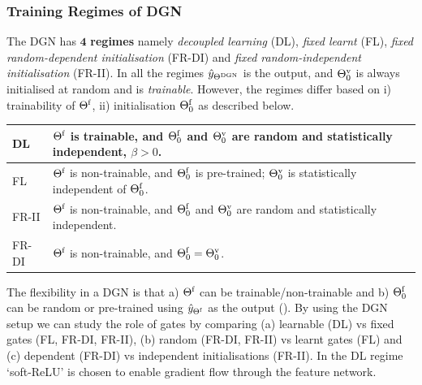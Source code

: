 \subsubsection{Training Regimes of DGN}
\begin{definition}\label{rm:regime}The DGN has $\mathbf{4}$ \textbf{regimes} namely \emph{decoupled learning} (DL), \emph{fixed learnt} (FL), \emph{fixed random-dependent initialisation} (FR-DI) and \emph{fixed random-independent initialisation} (FR-II). 
In all the regimes $\hat{y}_{\Theta^{\text{DGN}}}$ is the output, and ${\Theta}^{\text{v}}_0$ is always initialised at random and is \emph{trainable}. However, the regimes differ based on i) trainability of $\Theta^{\textrm{f}}$, ii) initialisation $\Theta^{\textrm{f}}_0$ as described below.\\
\begin{tabular}{|l|p{6cm}|}\hline
DL               & $\Theta^{\textrm{f}}$ is trainable, and $\Theta^{\textrm{f}}_0$ and ${\Theta}^{\text{v}}_0$ are random and statistically independent,  $\beta>0$.\\\hline
FL               & $\Theta^{\textrm{f}}$ is non-trainable, and $\Theta^{\textrm{f}}_0$ is pre-trained;  ${\Theta}^{\text{v}}_0$ is statistically independent of $\Theta^{\textrm{f}}_0$. \\\hline
FR-II            & $\Theta^{\textrm{f}}$ is non-trainable, and $\Theta^{\textrm{f}}_0$ and ${\Theta}^{\text{v}}_0$ are random and statistically independent.\\\hline
FR-DI   &  $\Theta^{\textrm{f}}$ is non-trainable, and $\Theta^{\textrm{f}}_0={\Theta}^{\text{v}}_0$.\\\hline
\end{tabular}
\end{definition}
The flexibility in a DGN is that  a) $\Theta^{\textrm{f}}$ can be trainable/non-trainable and b) $\Theta^{\textrm{f}}_0$ can be random or pre-trained using $\hat{y}_{{\Theta}^{\text{f}}}$ as the output (). By using the DGN setup we can study the role of gates by comparing (a) learnable (DL) vs fixed gates (FL, FR-DI, FR-II), (b) random (FR-DI, FR-II) vs learnt gates (FL) and (c) dependent (FR-DI) vs independent initialisations (FR-II). In the DL regime `soft-ReLU' is chosen to enable gradient flow through the feature network.
